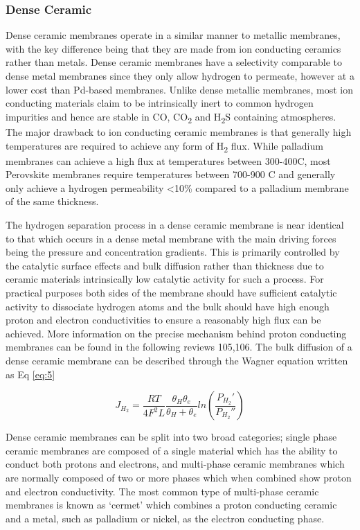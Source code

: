 \subsubsection{Dense Ceramic}
Dense ceramic membranes operate in a similar manner to metallic membranes, with the key 
difference being that they are made from ion conducting ceramics rather than metals. 
Dense ceramic membranes have a selectivity comparable to dense metal membranes since they 
only allow hydrogen to permeate, however at a lower cost than Pd-based membranes. 
Unlike dense metallic membranes, most ion conducting materials claim to be intrinsically 
inert to common hydrogen impurities and hence are stable in CO, CO\textsubscript{2} 
and H\textsubscript{2}S containing atmospheres. The major drawback to ion conducting ceramic
membranes is that generally high temperatures are required to achieve any form of 
H\textsubscript{2} flux. While palladium membranes can achieve a high flux at temperatures 
between 300-400\textdegree C, most Perovskite membranes require temperatures between 700-900\textdegree 
C and generally only achieve a hydrogen permeability <10\% compared to a palladium 
membrane of the same thickness.  

The hydrogen separation process in a dense ceramic membrane is near identical to that which 
occurs in a dense metal membrane with the main driving forces being the pressure and 
concentration gradients. This is primarily controlled by the catalytic surface effects and 
bulk diffusion rather than thickness due to ceramic materials intrinsically low catalytic 
activity for such a process. For practical purposes both sides of the membrane should have 
sufficient catalytic activity to dissociate hydrogen atoms and the bulk should have high 
enough proton and electron conductivities to ensure a reasonably high flux can be achieved. 
More information on the precise mechanism behind proton conducting membranes can be found in 
the following reviews 105,106. The bulk diffusion of a dense ceramic membrane can be 
described through the Wagner equation written as Eq \ref{eq:5}

\begin{equation} \label{eq:5}
    J_{H_2} = \frac{RT}{4F^2L} \frac{\theta_H \theta_e}{\theta_H + \theta_e} ln \left(\frac{P_{H_2}'}{P_{H_2}''} \right)
\end{equation}
\renewcommand{\bibname}{References}

Dense ceramic membranes can be split into two broad categories; single phase ceramic 
membranes are composed of a single material which has the ability to conduct both protons 
and electrons, and multi-phase ceramic membranes which are normally composed of two or more 
phases which when combined show proton and electron conductivity. The most common type of 
multi-phase ceramic membranes is known as ‘cermet’ which combines a proton conducting ceramic 
and a metal, such as palladium or nickel, as the electron conducting phase.

